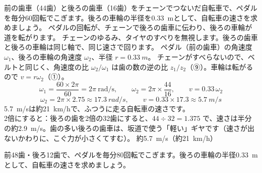 \begin{phreidai}[自転車のギヤとスピード]\label{ph:力-7:ex12}
前の歯車（44歯）と後ろの歯車（16歯）をチェーンでつないだ自転車で、ペダルを毎分60回転でこぎます。後ろの車輪の半径を\qty{0.33}{m}として、自転車の速さを求めましょう。
\phbamen
ペダルの回転が、チェーンで後ろの歯車に伝わり、後ろの車輪が道を転がります。
\phmushi
チェーンのゆるみ、タイヤのすべりを無視します。後ろの歯車と後ろの車輪は同じ軸で、同じ速さで回ります。
\phzu
ペダル（前の歯車）の角速度 $\omega_1$、後ろの車輪の角速度 $\omega_2$、半径 $r=\qty{0.33}{m}$。
\phriyu
チェーンがすべらないので、ベルトと同じく、角速度の比 $\omega_2/\omega_1$ は歯の数の逆の比 $z_1/z_2$（⑨）。車輪は転がるので $v=r\omega_2$（①）。
\phtateru
\[\omega_1=\frac{60\times2\pi}{60}=2\pi\ \text{rad/s},\qquad \omega_2=2\pi\times\frac{44}{16},\qquad v=0.33\,\omega_2\]
\phtoku
\[\omega_2=2\pi\times2.75\approx\qty{17.3}{rad/s},\qquad v=0.33\times17.3\approx\qty{5.7}{m/s}\]
\phtashikame
\qty{5.7}{m/s}は約\qty{21}{km/h}で、ふつうに走る自転車の速さです。\\
2倍にすると：後ろの歯を2倍の32歯にすると、$44\div32=1.375$ で、速さは半分の約\qty{2.9}{m/s}。歯の多い後ろの歯車は、坂道で使う「軽い」ギヤです（速さが出ないかわりに、こぐ力が小さくてすむ）。
\kotae 約\qty{5.7}{m/s}（約\qty{21}{km/h}）
\end{phreidai}
\begin{jibun}
前48歯・後ろ12歯で、ペダルを毎分80回転でこぎます。後ろの車輪の半径\qty{0.33}{m}として、自転車の速さを求めましょう。
\end{jibun}

